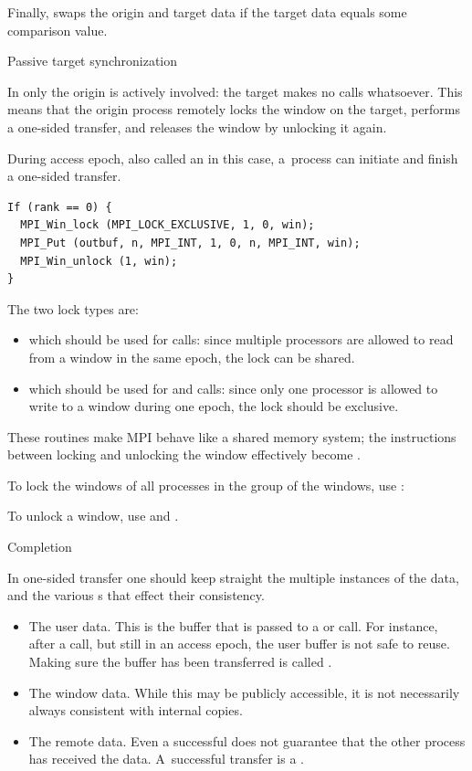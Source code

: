 Finally,  swaps the origin and
target data if the target data equals some comparison value.
%

 {Passive target synchronization}
\label{sec:passive-sync}

In  only the origin is
actively involved: the target makes no calls whatsoever.
This means that the origin process remotely locks the window
on the target, performs a one-sided transfer, and releases the window
by unlocking it again.

During access epoch, also called an
 in this case,
a~process can initiate and finish a one-sided
transfer.
\begin{lstlisting}
If (rank == 0) {
  MPI_Win_lock (MPI_LOCK_EXCLUSIVE, 1, 0, win);
  MPI_Put (outbuf, n, MPI_INT, 1, 0, n, MPI_INT, win);
  MPI_Win_unlock (1, win);
}
\end{lstlisting}
The two lock types are:
\begin{itemize}
\item {} which should be used for 
  calls: since multiple processors are allowed to read from a window
  in the same epoch, the lock can be shared.
\item {} which should be used for
   and  calls: since only one processor is
  allowed to write to a window during one epoch, the lock should be
  exclusive.
\end{itemize}
These routines make MPI behave like a shared memory system; the
instructions between locking and unlocking the window effectively
become .
%

To lock the windows of all processes in the group of the windows, use
:
%

To unlock a window, use  and
.


 {Completion}

In one-sided transfer one should keep straight the multiple instances
of the data, and the various s that effect
their consistency.
\begin{itemize}
\item The user data. This is the buffer that is passed to a  or
   call. For instance, after a  call, but still in an
  access epoch, the user buffer is not safe to reuse. Making sure the
  buffer has been transferred is called .
\item The window data. While this may be publicly accessible, it is
  not necessarily always consistent with internal copies.
\item The remote data. Even a successful  does not guarantee
  that the other process has received the data. A~successful transfer
  is a .
\end{itemize}

